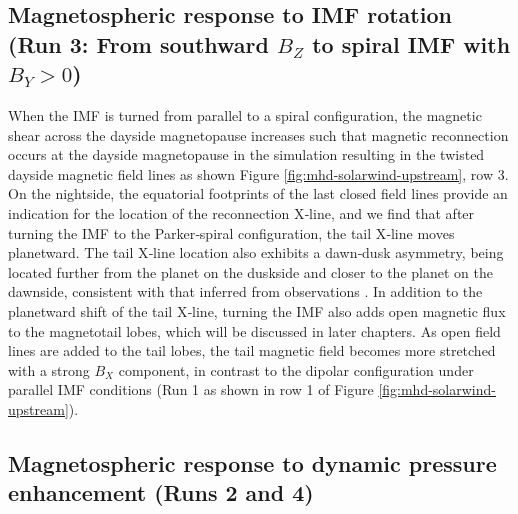 \subsection{Magnetospheric response to IMF rotation (Run 3: From southward \texorpdfstring{$B_Z$}{Bz} to spiral IMF with \texorpdfstring{$B_Y > 0$}{By>0}) }

When the IMF is turned from parallel to a spiral configuration, the magnetic shear across the dayside magnetopause increases such that magnetic reconnection occurs at the dayside magnetopause in the simulation resulting in the twisted dayside magnetic field lines as shown Figure \ref{fig:mhd-solarwind-upstream}, row 3. On the nightside, the equatorial footprints of the last closed field lines provide an indication for the location of the reconnection X‐line, and we find that after turning the IMF to the Parker‐spiral configuration, the tail X‐line moves planetward. The tail X‐line location also exhibits a dawn‐dusk asymmetry, being located further from the planet on the duskside and closer to the planet on the dawnside, consistent with that inferred from observations \cite{Vogt2010a,Vogt2014,Woch2002a}. In addition to the planetward shift of the tail X‐line, turning the IMF also adds open magnetic flux to the magnetotail lobes, which will be discussed in later chapters. As open field lines are added to the tail lobes, the tail magnetic field becomes more stretched with a strong $B_X$ component, in contrast to the dipolar configuration under parallel IMF conditions (Run 1 as shown in row 1 of Figure \ref{fig:mhd-solarwind-upstream}). 

\subsection{Magnetospheric response to dynamic pressure enhancement (Runs 2 and 4)}

